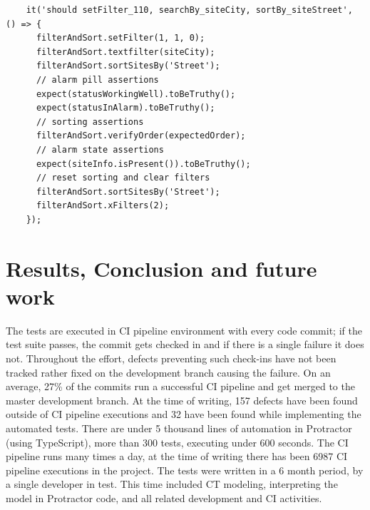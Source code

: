 \documentclass[conference]{IEEEtran}
\begin{document}
	\begin{lstlisting}
    it('should setFilter_110, searchBy_siteCity, sortBy_siteStreet', () => {
      filterAndSort.setFilter(1, 1, 0);
      filterAndSort.textfilter(siteCity);
      filterAndSort.sortSitesBy('Street');
      // alarm pill assertions
      expect(statusWorkingWell).toBeTruthy();
      expect(statusInAlarm).toBeTruthy(); 
      // sorting assertions
      filterAndSort.verifyOrder(expectedOrder);
      // alarm state assertions
      expect(siteInfo.isPresent()).toBeTruthy();
      // reset sorting and clear filters
      filterAndSort.sortSitesBy('Street');
      filterAndSort.xFilters(2);
    });
	\end{lstlisting}


\section{Results, Conclusion and future work}
The tests are executed in CI pipeline environment with every code commit; if the test suite passes, the commit gets checked in and if there is a single failure it does not.
Throughout the effort, defects preventing such check-ins have not been tracked rather fixed on the development branch causing the failure.
On an average, 27\% of the commits run a successful CI pipeline and get merged to the master development branch.
At the time of writing, 157 defects have been found outside of CI pipeline executions and 32 have been found while implementing the automated tests.
There are under 5 thousand lines of automation in Protractor (using TypeScript), more than 300 tests, executing under 600 seconds.
The CI pipeline runs many times a day, at the time of writing there has been 6987 CI pipeline executions in the project.
The tests were written in a 6 month period, by a single developer in test. 
This time included CT modeling, interpreting the model in Protractor code, and all related development and CI activities.
\end{document}
